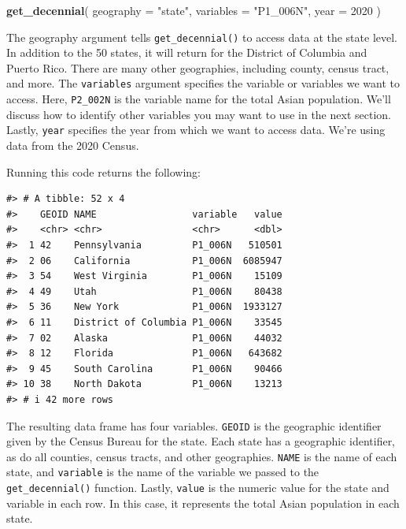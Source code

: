 \documentclass[
]{book}
\newenvironment{Shaded}{\begin{snugshade}}{\end{snugshade}}
\newcommand{\AttributeTok}[1]{\textcolor[rgb]{0.13,0.29,0.53}{#1}}
\newcommand{\DecValTok}[1]{\textcolor[rgb]{0.00,0.00,0.81}{#1}}
\newcommand{\FunctionTok}[1]{\textcolor[rgb]{0.13,0.29,0.53}{\textbf{#1}}}
\newcommand{\NormalTok}[1]{#1}
\newcommand{\StringTok}[1]{\textcolor[rgb]{0.31,0.60,0.02}{#1}}
\begin{document}
\begin{Shaded}
\begin{Highlighting}[]
\FunctionTok{get\_decennial}\NormalTok{(}
  \AttributeTok{geography =} \StringTok{"state"}\NormalTok{,}
  \AttributeTok{variables =} \StringTok{"P1\_006N"}\NormalTok{,}
  \AttributeTok{year =} \DecValTok{2020}
\NormalTok{)}
\end{Highlighting}
\end{Shaded}

The geography argument tells \texttt{get\_decennial()} to access data at the state level. In addition to the 50 states, it will return for the District of Columbia and Puerto Rico. There are many other geographies, including county, census tract, and more. The \texttt{variables} argument specifies the variable or variables we want to access. Here, \texttt{P2\_002N} is the variable name for the total Asian population. We'll discuss how to identify other variables you may want to use in the next section. Lastly, \texttt{year} specifies the year from which we want to access data. We're using data from the 2020 Census.

Running this code returns the following:

\begin{verbatim}
#> # A tibble: 52 x 4
#>    GEOID NAME                 variable   value
#>    <chr> <chr>                <chr>      <dbl>
#>  1 42    Pennsylvania         P1_006N   510501
#>  2 06    California           P1_006N  6085947
#>  3 54    West Virginia        P1_006N    15109
#>  4 49    Utah                 P1_006N    80438
#>  5 36    New York             P1_006N  1933127
#>  6 11    District of Columbia P1_006N    33545
#>  7 02    Alaska               P1_006N    44032
#>  8 12    Florida              P1_006N   643682
#>  9 45    South Carolina       P1_006N    90466
#> 10 38    North Dakota         P1_006N    13213
#> # i 42 more rows
\end{verbatim}

The resulting data frame has four variables. \texttt{GEOID} is the geographic identifier given by the Census Bureau for the state. Each state has a geographic identifier, as do all counties, census tracts, and other geographies. \texttt{NAME} is the name of each state, and \texttt{variable} is the name of the variable we passed to the \texttt{get\_decennial()} function. Lastly, \texttt{value} is the numeric value for the state and variable in each row. In this case, it represents the total Asian population in each state.
\end{document}
